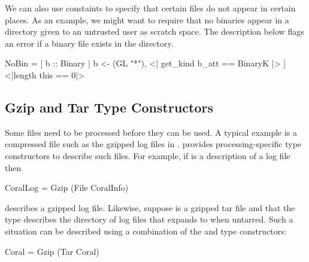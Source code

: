 We can also use constaints to specify that certain files do not appear
in certain places.  As an example, we might want to require that no
binaries appear in a directory given to an untrusted user as scratch
space. The description below flags an error if a binary file exists
in the directory. 
\begin{code}
 NoBin =
  [ b :: Binary | b <-  (GL "*"), 
               <| get_kind b_att == BinaryK |> ]
   <|length this == 0|>
\end{code}



\subsection{Gzip and Tar Type Constructors}
\label{sec:file-modifiers}

Some files need to be processed before they can be used.  A typical
example is a compressed file such as the gzipped log files in 
\coral{}.  \forest{} provides processing-specific type
constructors to describe such files.   For example, if
 is a \padshaskell{} 
description of a \coral{} log file then 
\begin{code}
 CoralLog = Gzip (File CoralInfo)
\end{code}
describes a gzipped log file.
Likewise, suppose  is a gzipped tar file and that the type
 describes the directory of log files that  expands
to when untarred.  Such a situation can be described using a
combination of the  and  type constructors:
\begin{code}
 Coral = Gzip (Tar Coral)
\end{code}



